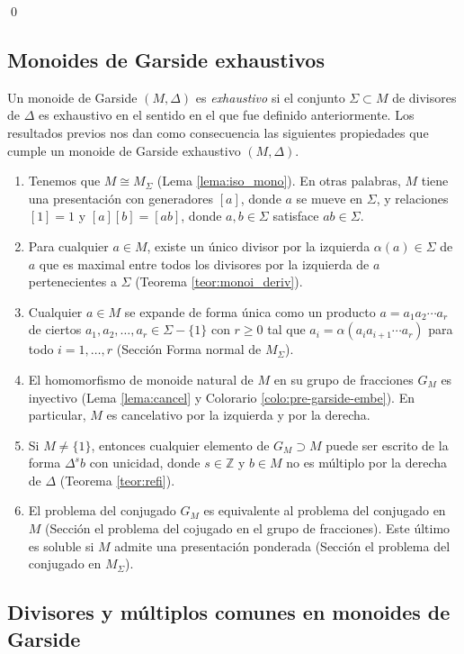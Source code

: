 \documentclass[12pt]{article}
\theoremstyle{definition}
\begin{document}
\qed

\subsection{Monoides de Garside exhaustivos}

Un monoide de Garside $(M,\Delta)$ es \textit{exhaustivo} si el conjunto $\Sigma\subset M$ de divisores de $\Delta$ es exhaustivo en el sentido en el que fue definido anteriormente. Los resultados previos nos dan como consecuencia las siguientes propiedades que cumple un monoide de Garside exhaustivo $(M,\Delta)$.

\begin{enumerate}[label=(\arabic*)]
\item Tenemos que $M\cong M_\Sigma$ (Lema \ref{lema:iso_mono}). En otras palabras, $M$ tiene una presentación con generadores $[a]$, donde $a$ se mueve en $\Sigma$, y relaciones $[1]=1$ y $[a][b]=[ab]$, donde $a,b\in\Sigma$ satisface $ab\in\Sigma$.
\item Para cualquier $a\in M$, existe un único divisor por la izquierda $\alpha(a)\in\Sigma$ de $a$ que es maximal entre todos los divisores por la izquierda de $a$ pertenecientes a $\Sigma$ (Teorema \ref{teor:monoi_deriv}).
\item Cualquier $a\in M$ se expande de forma única como un producto $a=a_1a_2\cdots a_r$ de ciertos $a_1,a_2,\ldots,a_r\in\Sigma - \{1\}$ con $r\geq 0$ tal que $a_i=\alpha(a_ia_{i+1}\cdots a_r)$ para todo $i=1,\ldots,r$ (Sección Forma normal de $M_\Sigma$).
\item El homomorfismo de monoide natural de $M$ en su grupo de fracciones $G_M$ es inyectivo (Lema \ref{lema:cancel} y Colorario \ref{colo:pre-garside-embe}). En particular, $M$ es cancelativo por la izquierda y por la derecha.
\item Si $M\neq \{1\}$, entonces cualquier elemento de $G_M\supset M$ puede ser escrito de la forma $\Delta^s b$ con unicidad, donde $s\in\mathbb{Z}$ y $b\in M$ no es múltiplo por la derecha de $\Delta$ (Teorema \ref{teor:refi}).
\item El problema del conjugado $G_M$ es equivalente al problema del conjugado en $M$ (Sección el problema del cojugado en el grupo de fracciones). Este último es soluble si $M$ admite una presentación ponderada (Sección el problema del conjugado en $M_\Sigma$).
\end{enumerate}

\subsection{Divisores y múltiplos comunes en monoides de Garside}
\end{document}
